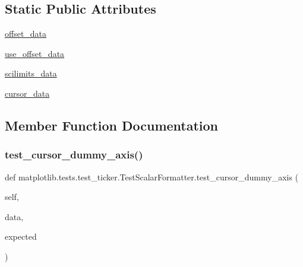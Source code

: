 \subsection*{Static Public Attributes}
\begin{DoxyCompactItemize}
\item 
\hyperlink{classmatplotlib_1_1tests_1_1test__ticker_1_1TestScalarFormatter_a1b7ecb93f89994ef7aced4c865381de2}{offset\+\_\+data}
\item 
\hyperlink{classmatplotlib_1_1tests_1_1test__ticker_1_1TestScalarFormatter_adbf901f47d0f04aaaf5a4378cd304d4a}{use\+\_\+offset\+\_\+data}
\item 
\hyperlink{classmatplotlib_1_1tests_1_1test__ticker_1_1TestScalarFormatter_a922f4cbd08d685c14bc4199b0f107e5c}{scilimits\+\_\+data}
\item 
\hyperlink{classmatplotlib_1_1tests_1_1test__ticker_1_1TestScalarFormatter_a3d7b3e685cf19fba1a435a19e17667a1}{cursor\+\_\+data}
\end{DoxyCompactItemize}


\subsection{Member Function Documentation}
\mbox{\label{classmatplotlib_1_1tests_1_1test__ticker_1_1TestScalarFormatter_a553470b421d6f3ff18cb0a5efbaa8346}} 
\subsubsection{\texorpdfstring{test\+\_\+cursor\+\_\+dummy\+\_\+axis()}{test\_cursor\_dummy\_axis()}}
{\footnotesize\ttfamily def matplotlib.\+tests.\+test\+\_\+ticker.\+Test\+Scalar\+Formatter.\+test\+\_\+cursor\+\_\+dummy\+\_\+axis (\begin{DoxyParamCaption}\item[{}]{self,  }\item[{}]{data,  }\item[{}]{expected }\end{DoxyParamCaption})}

